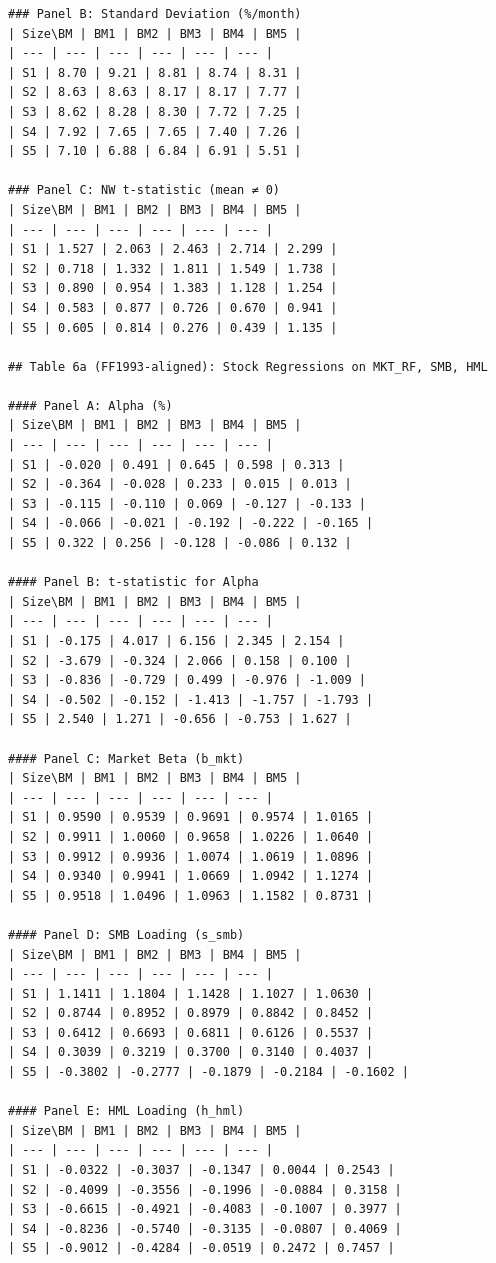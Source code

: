 \begin{verbatim}
### Panel B: Standard Deviation (%/month)
| Size\BM | BM1 | BM2 | BM3 | BM4 | BM5 |
| --- | --- | --- | --- | --- | --- |
| S1 | 8.70 | 9.21 | 8.81 | 8.74 | 8.31 |
| S2 | 8.63 | 8.63 | 8.17 | 8.17 | 7.77 |
| S3 | 8.62 | 8.28 | 8.30 | 7.72 | 7.25 |
| S4 | 7.92 | 7.65 | 7.65 | 7.40 | 7.26 |
| S5 | 7.10 | 6.88 | 6.84 | 6.91 | 5.51 |

### Panel C: NW t-statistic (mean ≠ 0)
| Size\BM | BM1 | BM2 | BM3 | BM4 | BM5 |
| --- | --- | --- | --- | --- | --- |
| S1 | 1.527 | 2.063 | 2.463 | 2.714 | 2.299 |
| S2 | 0.718 | 1.332 | 1.811 | 1.549 | 1.738 |
| S3 | 0.890 | 0.954 | 1.383 | 1.128 | 1.254 |
| S4 | 0.583 | 0.877 | 0.726 | 0.670 | 0.941 |
| S5 | 0.605 | 0.814 | 0.276 | 0.439 | 1.135 |

## Table 6a (FF1993-aligned): Stock Regressions on MKT_RF, SMB, HML

#### Panel A: Alpha (%)
| Size\BM | BM1 | BM2 | BM3 | BM4 | BM5 |
| --- | --- | --- | --- | --- | --- |
| S1 | -0.020 | 0.491 | 0.645 | 0.598 | 0.313 |
| S2 | -0.364 | -0.028 | 0.233 | 0.015 | 0.013 |
| S3 | -0.115 | -0.110 | 0.069 | -0.127 | -0.133 |
| S4 | -0.066 | -0.021 | -0.192 | -0.222 | -0.165 |
| S5 | 0.322 | 0.256 | -0.128 | -0.086 | 0.132 |

#### Panel B: t-statistic for Alpha
| Size\BM | BM1 | BM2 | BM3 | BM4 | BM5 |
| --- | --- | --- | --- | --- | --- |
| S1 | -0.175 | 4.017 | 6.156 | 2.345 | 2.154 |
| S2 | -3.679 | -0.324 | 2.066 | 0.158 | 0.100 |
| S3 | -0.836 | -0.729 | 0.499 | -0.976 | -1.009 |
| S4 | -0.502 | -0.152 | -1.413 | -1.757 | -1.793 |
| S5 | 2.540 | 1.271 | -0.656 | -0.753 | 1.627 |

#### Panel C: Market Beta (b_mkt)
| Size\BM | BM1 | BM2 | BM3 | BM4 | BM5 |
| --- | --- | --- | --- | --- | --- |
| S1 | 0.9590 | 0.9539 | 0.9691 | 0.9574 | 1.0165 |
| S2 | 0.9911 | 1.0060 | 0.9658 | 1.0226 | 1.0640 |
| S3 | 0.9912 | 0.9936 | 1.0074 | 1.0619 | 1.0896 |
| S4 | 0.9340 | 0.9941 | 1.0669 | 1.0942 | 1.1274 |
| S5 | 0.9518 | 1.0496 | 1.0963 | 1.1582 | 0.8731 |

#### Panel D: SMB Loading (s_smb)
| Size\BM | BM1 | BM2 | BM3 | BM4 | BM5 |
| --- | --- | --- | --- | --- | --- |
| S1 | 1.1411 | 1.1804 | 1.1428 | 1.1027 | 1.0630 |
| S2 | 0.8744 | 0.8952 | 0.8979 | 0.8842 | 0.8452 |
| S3 | 0.6412 | 0.6693 | 0.6811 | 0.6126 | 0.5537 |
| S4 | 0.3039 | 0.3219 | 0.3700 | 0.3140 | 0.4037 |
| S5 | -0.3802 | -0.2777 | -0.1879 | -0.2184 | -0.1602 |

#### Panel E: HML Loading (h_hml)
| Size\BM | BM1 | BM2 | BM3 | BM4 | BM5 |
| --- | --- | --- | --- | --- | --- |
| S1 | -0.0322 | -0.3037 | -0.1347 | 0.0044 | 0.2543 |
| S2 | -0.4099 | -0.3556 | -0.1996 | -0.0884 | 0.3158 |
| S3 | -0.6615 | -0.4921 | -0.4083 | -0.1007 | 0.3977 |
| S4 | -0.8236 | -0.5740 | -0.3135 | -0.0807 | 0.4069 |
| S5 | -0.9012 | -0.4284 | -0.0519 | 0.2472 | 0.7457 |


\end{verbatim}
